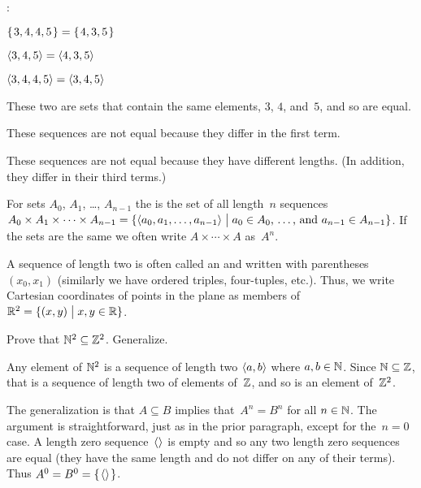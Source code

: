 \documentclass{test}  %
\begin{document}
\begin{ex}\pord:
\begin{items}
\item $\mbox{$\{\hspace{0.1em}3, 4, 4, 5\hspace{0.1em}\}$}=\mbox{$\{\hspace{0.1em}4, 3, 5\hspace{0.1em}\}$}$
\item $\langle3, 4, 5\rangle=\langle4, 3, 5\rangle$
\item $\langle3, 4, 4, 5\rangle=\langle3,4,5\rangle$  
\end{items}
\begin{ans}
\begin{items}
\item These two are sets that contain the same elements, $3$, $4$, and~$5$,
  and so are equal.
\item These sequences are not equal because they differ in the first term.
\item These sequences are not equal because they have different lengths.
  (In addition, they differ in their third terms.)
\end{items}
\end{ans}
\end{ex}

\begin{df}
For sets $A_0$, $A_1$, \ldots, $A_{n-1}$
the  
is the set of all length~$n$ sequences
$A_0\times A_1\times \cdots \times A_{n-1}
  =\{\langle a_0,a_1,\ldots,a_{n-1}\rangle \bigm| \text{$a_0\in A_0$, \ldots, and~$a_{n-1}\in A_{n-1}$}\}$.
If the sets are the same we often write $A\times\cdots\times A$ 
as~$A^n$.
\end{df}

A sequence of length two is often called an  and 
written with parentheses $(x_0,x_1)$
(similarly we have ordered triples, four-tuples, etc.).
Thus, we write 
Cartesian coordinates of points in the plane as members of
$\mathbb{R}^2=\{(x,y) \bigm| x,y\in\mathbb{R}\}$.

\begin{ex}
Prove that $\mathbb{N}^2\subseteq \mathbb{Z}^2$.
Generalize. 
\begin{ans}
Any element of $\mathbb{N}^2$ is a sequence of length two $\langle a,b\rangle$ where
$a,b\in\mathbb{N}$.
Since $\mathbb{N}\subseteq\mathbb{Z}$, that is a sequence of length two of elements of~$\mathbb{Z}$, 
and so is an element of~$\mathbb{Z}^2$.

The generalization is that $A\subseteq B$ implies that~$A^n=B^n$ for all 
$n\in\mathbb{N}$.
The argument is straightforward, just as in the prior paragraph,
except for the~$n=0$ case.
A length zero sequence~$\langle\rangle$ is empty and so any two 
length zero sequences are equal (they have the same length and do not 
differ on any of their terms).
Thus $A^0=B^0=\mbox{$\{\hspace{0.1em}\langle\rangle\hspace{0.1em}\}$}$.
\end{ans}
\end{ex}
\end{document}
